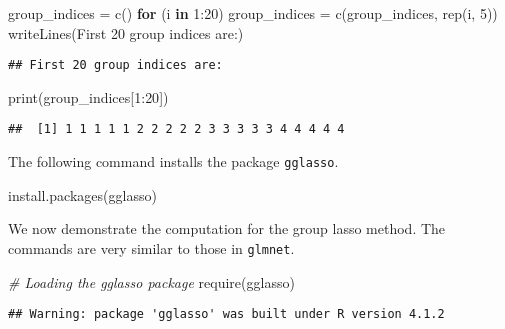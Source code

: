 \documentclass[
]{book}
\newenvironment{Shaded}{\begin{snugshade}}{\end{snugshade}}
\newcommand{\CommentTok}[1]{\textcolor[rgb]{0.56,0.35,0.01}{\textit{#1}}}
\newcommand{\ControlFlowTok}[1]{\textcolor[rgb]{0.13,0.29,0.53}{\textbf{#1}}}
\newcommand{\DecValTok}[1]{\textcolor[rgb]{0.00,0.00,0.81}{#1}}
\newcommand{\FunctionTok}[1]{\textcolor[rgb]{0.00,0.00,0.00}{#1}}
\newcommand{\NormalTok}[1]{#1}
\newcommand{\OtherTok}[1]{\textcolor[rgb]{0.56,0.35,0.01}{#1}}
\newcommand{\SpecialCharTok}[1]{\textcolor[rgb]{0.00,0.00,0.00}{#1}}
\newcommand{\StringTok}[1]{\textcolor[rgb]{0.31,0.60,0.02}{#1}}
\begin{document}
\begin{Shaded}
\begin{Highlighting}[]
\NormalTok{group\_indices }\OtherTok{=} \FunctionTok{c}\NormalTok{()}
\ControlFlowTok{for}\NormalTok{ (i }\ControlFlowTok{in} \DecValTok{1}\SpecialCharTok{:}\DecValTok{20}\NormalTok{)}
\NormalTok{  group\_indices }\OtherTok{=} \FunctionTok{c}\NormalTok{(group\_indices, }\FunctionTok{rep}\NormalTok{(i, }\DecValTok{5}\NormalTok{))}
\FunctionTok{writeLines}\NormalTok{(}\StringTok{\textquotesingle{}First 20 group indices are:\textquotesingle{}}\NormalTok{)}
\end{Highlighting}
\end{Shaded}

\begin{verbatim}
## First 20 group indices are:
\end{verbatim}

\begin{Shaded}
\begin{Highlighting}[]
\FunctionTok{print}\NormalTok{(group\_indices[}\DecValTok{1}\SpecialCharTok{:}\DecValTok{20}\NormalTok{])}
\end{Highlighting}
\end{Shaded}

\begin{verbatim}
##  [1] 1 1 1 1 1 2 2 2 2 2 3 3 3 3 3 4 4 4 4 4
\end{verbatim}

The following command installs the package \texttt{gglasso}.

\begin{Shaded}
\begin{Highlighting}[]
\FunctionTok{install.packages}\NormalTok{(}\StringTok{\textquotesingle{}gglasso\textquotesingle{}}\NormalTok{)}
\end{Highlighting}
\end{Shaded}

We now demonstrate the computation for the group lasso method. The commands are very similar to those in \texttt{glmnet}.

\begin{Shaded}
\begin{Highlighting}[]
\CommentTok{\# Loading the \textquotesingle{}gglasso\textquotesingle{} package}
\FunctionTok{require}\NormalTok{(gglasso)}
\end{Highlighting}
\end{Shaded}

\begin{verbatim}
## Warning: package 'gglasso' was built under R version 4.1.2
\end{verbatim}
\end{document}
